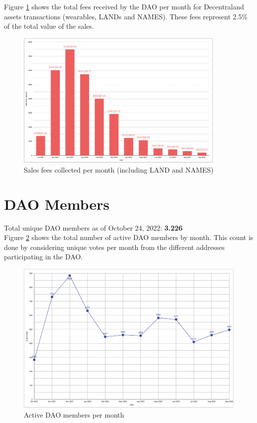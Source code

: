 \documentclass[MSE,Master,english]{twbook}%
\begin{document}
Figure \ref{fig:sales_fees} shows the total fees received by the \gls{DAO} per month for Decentraland assets transactions (wearables, LANDs and NAMES). These fees represent 2.5\% of the total value of the sales.
\begin{figure}[H]
  \centering
  \includegraphics[width=0.9\textwidth]{metrics/sales_fees.png}
  \caption{Sales fees collected per month (including \gls{LAND} and NAMES)}
  \label{fig:sales_fees}
\end{figure}

\section{DAO Members}
Total unique \gls{DAO} members as of October 24, 2022: \textbf{3.226} \\

Figure \ref{fig:active_members} shows the total number of active \gls{DAO} members by month. This count is done by considering unique votes per month from the different addresses participating in the \gls{DAO}.
\begin{figure}[H]
  \centering
  \includegraphics[width=\textwidth]{metrics/active_members.png}
  \caption{Active \gls{DAO} members per month}
  \label{fig:active_members}
\end{figure}
\end{document}
